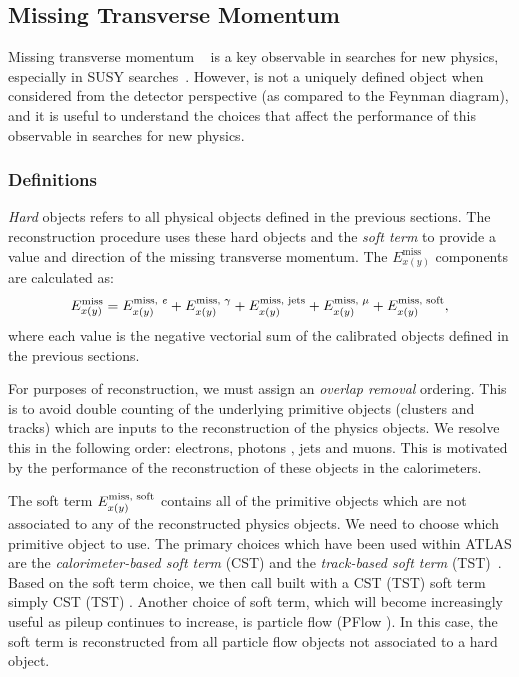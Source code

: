 \subsection{Missing Transverse Momentum}

Missing transverse momentum \met~\cite{Aad:2016nrq} is a key observable in searches for new physics, especially in SUSY searches~\cite{ATL-PHYS-PUB-2010-010,ATL-PHYS-PUB-2015-005}.
However, \met is not a uniquely defined object when considered from the detector perspective (as compared to the Feynman diagram), and it is useful to understand the choices that affect the performance of this observable in searches for new physics.

\subsubsection{\met Definitions}

\textit{Hard} objects refers to all physical objects defined in the previous sections.
The \met reconstruction procedure uses these hard objects and the \textit{soft term} to provide a value and direction of the missing transverse momentum.
The $E^{\text{miss}}_{x(y)}$ components are calculated as:
\begin{equation}
  \Emiss{x(y)} = \Emisscomp{x(y)}{\text{\textit{e}}}
               + \Emisscomp{x(y)}{\gamma}
               + \Emisscomp{x(y)}{\text{jets}}
               + \Emisscomp{x(y)}{\mu}
               + \Emisscomp{x(y)}{\text{soft}},
  \label{eq:met-sum}
\end{equation}
where each value  is the negative vectorial sum of the calibrated objects defined in the previous sections.

For purposes of \met reconstruction, we must assign an \textit{overlap removal} ordering.
This is to avoid double counting of the underlying primitive objects (clusters and tracks) which are inputs to the reconstruction of the physics objects.
We resolve this in the following order: electrons, photons , jets and muons.
This is motivated by the performance of the reconstruction of these objects in the calorimeters.

The soft term $\Emisscomp{x(y)}{\text{soft}}$ contains all of the primitive objects which are not associated to any of the reconstructed physics objects.
We need to choose which primitive object to use.
The primary choices which have been used within ATLAS are the \textit{ calorimeter-based soft term} (CST) and the \textit{track-based soft term} (TST)~\cite{Aad:2016nrq}.
Based on the soft term choice, we then call \met built with a CST (TST) soft term simply CST (TST) \met.
Another choice of soft term, which will become increasingly useful as pileup continues to increase, is particle flow \met (PFlow \met).
In this case, the soft term is reconstructed from all particle flow objects not associated to a hard object.

